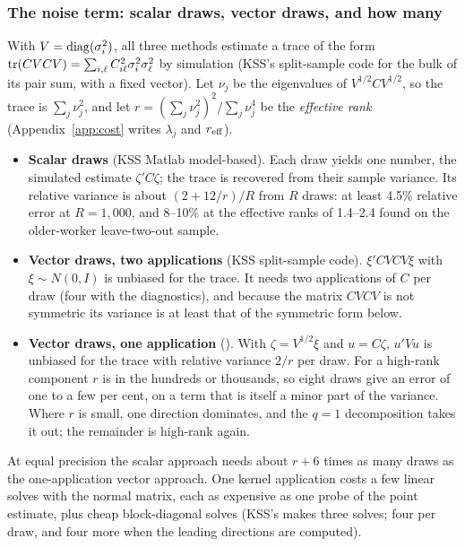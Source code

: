 \subsubsection{The noise term: scalar draws, vector draws, and how many}

With $V=\operatorname{diag}(\sigma_i^2)$, all three methods estimate a trace of the form $\operatorname{tr}(CVCV)=\sum_{i,\ell}C_{i\ell}^2
\sigma_i^2\sigma_\ell^2$ by simulation (KSS's split-sample code for the bulk of its pair sum, with a fixed
vector). Let $\nu_j$ be the eigenvalues of $V^{1/2}CV^{1/2}$, so the trace is $\sum_j\nu_j^2$,
and let $r=(\sum_j\nu_j^2)^2/\sum_j\nu_j^4$ be the \emph{effective rank} (Appendix~\ref{app:cost} writes $\lambda_j$
and $r_{\rm eff}$).

\begin{itemize}
\item \textbf{Scalar draws} (KSS Matlab model-based). Each draw yields one number, the simulated estimate
$\zeta'C\zeta$; the trace is recovered from their sample variance. Its relative variance is about
$(2+12/r)/R$ from $R$ draws: at least 4.5\% relative error at $R=1{,}000$, and 8--10\% at the effective
ranks of 1.4--2.4 found on the older-worker leave-two-out sample.
\item \textbf{Vector draws, two applications} (KSS split-sample code). $\xi'CVCV\xi$ with
$\xi\sim N(0,I)$ is unbiased for the trace. It needs two applications of $C$ per draw (four with the
diagnostics), and because the matrix $CVCV$ is not symmetric its variance is at least that of the
symmetric form below.
\item \textbf{Vector draws, one application} (\fevc). With $\zeta=V^{1/2}\xi$ and $u=C\zeta$,
$u'Vu$ is unbiased for the trace with relative variance $2/r$ per draw. For a high-rank component
$r$ is in the hundreds or thousands, so eight draws give an error of one to a few per cent, on a term that
is itself a minor part of the variance. Where $r$ is small, one direction dominates, and the $q=1$
decomposition takes it out; the remainder is high-rank again.
\end{itemize}
At equal precision the scalar approach needs about $r+6$ times as many draws as the one-application
vector approach. One kernel application costs a few linear solves with the normal matrix, each as
expensive as one probe of the point estimate, plus cheap block-diagonal solves (KSS's 
makes three solves; \fevc{} four per draw, and four more when the leading directions are computed).

